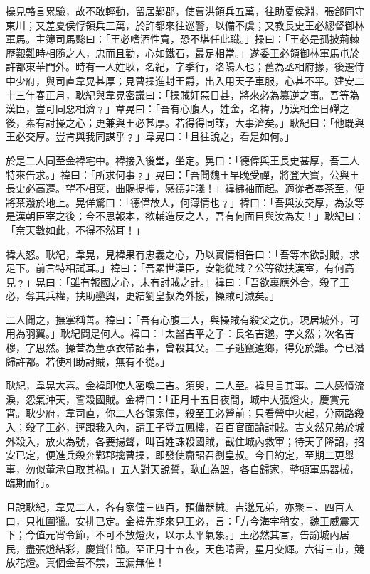 操見輅言累驗，故不敢輕動，留居鄴郡，使曹洪領兵五萬，往助夏侯淵，張郃同守東川；又差夏侯惇領兵三萬，於許都來往巡警，以備不虞；又教長史王必總督御林軍馬。主簿司馬懿曰：「王必嗜酒性寬，恐不堪任此職。」操曰：「王必是孤披荊棘歷艱難時相隨之人，忠而且勤，心如鐵石，最足相當。」遂委王必領御林軍馬屯於許都東華門外。時有一人姓耿，名紀，字季行，洛陽人也；舊為丞相府掾，後遷侍中少府，與司直韋晃甚厚；見曹操進封王爵，出入用天子車服，心甚不平。建安二十三年春正月，耿紀與韋晃密議曰：「操賊奸惡日甚，將來必為篡逆之事。吾等為漢臣，豈可同惡相濟﹖」韋晃曰：「吾有心腹人，姓金，名褘，乃漢相金日磾之後，素有討操之心；更兼與王必甚厚。若得得同謀，大事濟矣。」耿紀曰：「他既與王必交厚。豈肯與我同謀乎﹖」韋晃曰：「且往說之，看是如何。」

於是二人同至金褘宅中。褘接入後堂，坐定。晃曰：「德偉與王長史甚厚，吾三人特來告求。」褘曰：「所求何事﹖」晃曰：「吾聞魏王早晚受禪，將登大寶，公與王長史必高遷。望不相棄，曲賜提攜，感德非淺！」褘拂袖而起。適從者奉茶至，便將茶潑於地上。晃佯驚曰：「德偉故人，何薄情也﹖」褘曰：「吾與汝交厚，為汝等是漢朝臣宰之後；今不思報本，欲輔造反之人，吾有何面目與汝為友！」耿紀曰：「奈天數如此，不得不然耳！」

褘大怒。耿紀，韋晃，見褘果有忠義之心，乃以實情相告曰：「吾等本欲討賊，求足下。前言特相試耳。」褘曰：「吾累世漢臣，安能從賊？公等欲扶漢室，有何高見﹖」晃曰：「雖有報國之心，未有討賊之計。」褘曰：「吾欲裏應外合，殺了王必，奪其兵權，扶助鑾輿，更結劉皇叔為外援，操賊可滅矣。」

二人聞之，撫掌稱善。褘曰：「吾有心腹二人，與操賊有殺父之仇，現居城外，可用為羽翼。」耿紀問是何人。褘曰：「太醫吉平之子：長名吉邈，字文然；次名吉穆，字思然。操昔為董承衣帶詔事，曾殺其父。二子逃竄遠鄉，得免於難。今已潛歸許都。若使相助討賊，無有不從。」

耿紀，韋晃大喜。金褘即使人密喚二吉。須臾，二人至。褘具言其事。二人感憤流淚，怨氣沖天，誓殺國賊。金褘曰：「正月十五日夜間，城中大張燈火，慶賞元宵。耿少府，韋司直，你二人各領家僮，殺至王必營前；只看營中火起，分兩路殺入；殺了王必，逕跟我入內，請王子登五鳳樓，召百官面諭討賊。吉文然兄弟於城外殺入，放火為號，各要揚聲，叫百姓誅殺國賊，截住城內救軍；待天子降詔，招安已定，便進兵殺奔鄴郡擒曹操，即發使齎詔召劉皇叔。今日約定，至期二更舉事，勿似董承自取其禍。」五人對天說誓，歃血為盟，各自歸家，整頓軍馬器械，臨期而行。

且說耿紀，韋晃二人，各有家僮三四百，預備器械。吉邈兄弟，亦聚三、四百人口，只推圍獵。安排已定。金褘先期來見王必，言：「方今海宇稍安，魏王威震天下；今值元宵令節，不可不放燈火，以示太平氣象。」王必然其言，告諭城內居民，盡張燈結彩，慶賞佳節。至正月十五夜，天色晴霽，星月交輝。六街三市，競放花燈。真個金吾不禁，玉漏無催！

